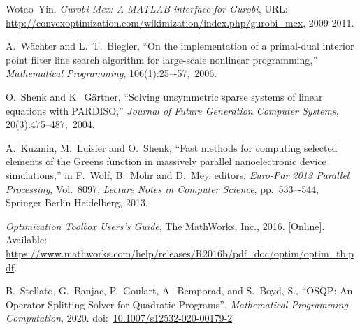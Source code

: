 \documentclass[12pt]{article}
\numberwithin{equation}{section}
\numberwithin{table}{section}
\numberwithin{figure}{section}
\begin{document}
\begin{thebibliography}{99}
Wotao~Yin. \emph{Gurobi Mex: A MATLAB interface for Gurobi}, URL: \url{http://convexoptimization.com/wikimization/index.php/gurobi_mex}, 2009-2011.

A.~W\"achter and L.~T.~Biegler, ``On the implementation of a primal-dual interior point filter line search algorithm for large-scale nonlinear programming,'' \emph{Mathematical Programming}, 106(1):25–-57,~2006.

O.~Shenk and K.~G\"artner, ``Solving unsymmetric sparse systems of linear equations with PARDISO,'' \emph{Journal of Future Generation Computer Systems}, 20(3):475--487,~2004.

A.~Kuzmin, M.~Luisier and O.~Shenk, ``Fast methods for computing selected elements of the Greens function in massively parallel nanoelectronic device simulations,'' in F.~Wolf, B.~Mohr and D.~Mey, editors, \emph{Euro-Par 2013 Parallel Processing}, Vol.~8097, \emph{Lecture Notes in Computer Science}, pp.~533–-544, Springer Berlin Heidelberg, 2013.

\emph{Optimization Toolbox Users's Guide}, The MathWorks, Inc., 2016.
  [Online]. Available: \url{https://www.mathworks.com/help/releases/R2016b/pdf_doc/optim/optim_tb.pdf}.

B.~Stellato, G.~Banjac, P.~Goulart, A.~Bemporad, and S.~Boyd, S., ``{OSQP}: An Operator Splitting Solver for Quadratic Programs'', \emph{Mathematical Programming Computation}, 2020.
doi:~\href{https://doi.org/10.1007/s12532-020-00179-2}{10.1007/s12532-020-00179-2}

\end{thebibliography}
\end{document}
